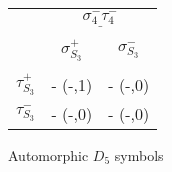 \documentclass[12pt]{article}
\begin{document}
\begin{center}
\begin{tabular}{ c | c | c |}
\multicolumn{1}{c}{} &\multicolumn{2}{c}{$\underline{\sigma_4^- \tau_4^-}$} \\[-1em]
\multicolumn{1}{c}{} & \multicolumn{1}{c}{} & \multicolumn{1}{c}{}\\
\multicolumn{1}{c}{} & \multicolumn{1}{c}{$\sigma_{S_3}^+$} & \multicolumn{1}{c}{$\sigma_{S_3}^-$} \\[-1em]
\multicolumn{1}{c}{} & \multicolumn{1}{c}{} & \multicolumn{1}{c}{} \\
\cline{2-3} $\tau_{S_3}^+$ & - (-,1) & - (-,0) \\
\cline{2-3} $\tau_{S_3}^-$ & - (-,0) & - (-,0) \\
\cline{2-3}
\end{tabular}
\vspace{.6cm}

Automorphic $D_5$ symbols


\end{center}
\end{document}
